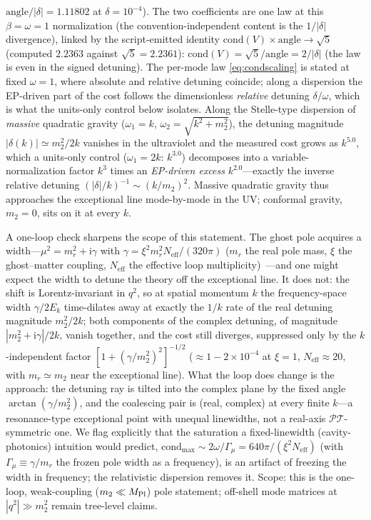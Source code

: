 \documentclass[11pt]{article}
\theoremstyle{definition}
\theoremstyle{remark}
\newcommand{\PT}{\mathcal{PT}}
\newcommand{\ii}{\mathrm{i}}
\begin{document}
$\mathrm{angle}/|\delta|=1.11802$ at $\delta=10^{-4}$). The two coefficients are one law at this $\beta=\omega=1$ normalization
(the convention-independent content is the $1/|\delta|$ divergence),
linked by the script-emitted identity
$\mathrm{cond}(V)\times\mathrm{angle}\to\sqrt5$ (computed $2.2363$
against $\sqrt5=2.2361$):
$\mathrm{cond}(V)=\sqrt5/\mathrm{angle}=2/|\delta|$ (the law is
even in the signed detuning). The per-mode
law \eqref{eq:condscaling} is stated at fixed $\omega=1$, where
absolute and relative detuning coincide; along a dispersion the
EP-driven part of the cost follows the dimensionless
\emph{relative} detuning $\delta/\omega$, which is what the
units-only control below isolates. Along the Stelle-type
dispersion of \emph{massive} quadratic gravity
($\omega_1=k$, $\omega_2=\sqrt{k^{2}+m_2^{2}}$), the detuning
magnitude $|\delta(k)|\simeq m_2^{2}/2k$ vanishes in the ultraviolet and the
measured cost grows as $k^{5.0}$, which a units-only control
($\omega_1=2k$: $k^{3.0}$) decomposes into a variable-normalization
factor $k^{3}$ times an \emph{EP-driven excess}
$k^{2.0}$---exactly the inverse relative detuning
$(|\delta|/k)^{-1}\sim(k/m_2)^{2}$. Massive quadratic gravity thus
approaches the exceptional line mode-by-mode in the UV; conformal
gravity, $m_2=0$, sits on it at every $k$.

A one-loop check sharpens the scope of this statement. The ghost
pole acquires a width---$\mu^{2}=m_r^{2}+\ii\gamma$ with
$\gamma=\xi^{2}m_r^{2}N_{\text{eff}}/(320\pi)$ ($m_r$ the real pole
mass, $\xi$ the ghost--matter coupling, $N_{\text{eff}}$ the
effective loop multiplicity)~\cite{DonoghueMenezes}---and one might
expect the width to detune
the theory off the exceptional line. It does not: the shift is
Lorentz-invariant in $q^{2}$, so at spatial momentum $k$ the
frequency-space width $\gamma/2E_k$ time-dilates away at exactly
the $1/k$ rate of the real detuning magnitude $m_2^{2}/2k$; both
components of the complex detuning, of magnitude
$|m_2^{2}+\ii\gamma|/2k$, vanish together,
and the cost still diverges, suppressed only by the $k$-independent
factor $[1+(\gamma/m_2^{2})^{2}]^{-1/2}$
($\approx1-2\times10^{-4}$ at $\xi=1$,
$N_{\text{eff}}\approx20$, with $m_r\simeq m_2$ near the exceptional line). What the loop does change is the
approach: the detuning ray is tilted into the complex plane by the
fixed angle $\arctan(\gamma/m_2^{2})$, and the coalescing pair is
(real, complex) at every finite $k$---a resonance-type exceptional
point with unequal linewidths, not a real-axis $\PT$-symmetric one.
We flag explicitly that the saturation a fixed-linewidth
(cavity-photonics) intuition would predict,
$\mathrm{cond}_{\max}\sim2\omega/\Gamma_\mu=640\pi/(\xi^{2}
N_{\text{eff}})$ (with $\Gamma_\mu\equiv\gamma/m_r$ the frozen pole
width as a frequency), is an artifact of freezing the width in
frequency; the relativistic dispersion removes it. Scope: this is
the one-loop, weak-coupling ($m_2\ll M_{\rm Pl}$) pole statement; off-shell
mode matrices at $|q^{2}|\gg m_2^{2}$ remain tree-level claims.
\end{document}
